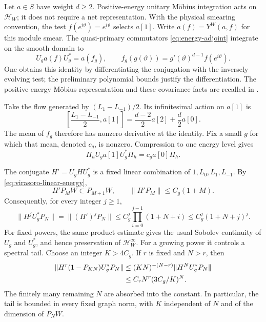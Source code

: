 Let $a\in S$ have weight $d\geq2$.  Positive-energy unitary Möbius
integration acts on $\mathcal H_W$; it does not require a net
representation.  With the physical smearing convention, the test
$f(e^{i\vartheta})=e^{i\vartheta}$ selects $a[1]$.  Write
$a(f)=Y^W(a,f)$ for this module smear.  The
quasi-primary commutators \eqref{eq:energy-adjoint} integrate on the
smooth domain to
\[
 U_g a(f)U_g^*=a(f_g),\qquad
 f_g(g(\vartheta))=g'(\vartheta)^{d-1}f(e^{i\vartheta}).
\]
One obtains this identity by differentiating the conjugation with the
inversely evolving test; the preliminary polynomial bounds justify the
differentiation.  The positive-energy Möbius representation and these
covariance facts are recalled in \cite[Section~2]{CTW}.

Take the flow generated by $(L_1-L_{-1})/2$.  Its infinitesimal action
on $a[1]$ is
\[
 \left[\frac{L_1-L_{-1}}2,a[1]\right]
       =\frac{d-2}{2}a[2]+\frac d2a[0].
\]
The mean of $f_g$ therefore has nonzero derivative at the identity.
Fix a small $g$ for which that mean, denoted $c_g$, is nonzero.
Compression to one energy level gives
\begin{equation}\label{eq:mobius-zero-compression}
 \Pi_hU_ga[1]U_g^*\Pi_h=c_g a[0]\Pi_h.
\end{equation}

The conjugate $H'=U_gHU_g^*$ is a fixed linear combination of
$1,L_0,L_1,L_{-1}$.  By \eqref{eq:virasoro-linear-energy},
\[
 H'P_MW\subset P_{M+1}W,\qquad
 \|H'P_M\|\leq C_g(1+M).
\]
Consequently, for every integer $j\geq1$,
\begin{equation}\label{eq:mobius-growing-moment}
 \|H^jU_g^*P_N\|
 =\|(H')^jP_N\|
 \leq C_g^j\prod_{i=0}^{j-1}(1+N+i)
 \leq C_g^j(1+N+j)^j.
\end{equation}
For fixed powers, the same product estimate gives the usual Sobolev
continuity of $U_g$ and $U_g^*$, and hence preservation of
$\mathcal H_W^\infty$.  For a growing power it controls a spectral
tail.  Choose an integer $K>4C_g$.  If $r$ is fixed and $N>r$, then
\begin{align}
 \|H^r(1-P_{KN})U_g^*P_N\|
 &\leq (KN)^{-(N-r)}\|H^NU_g^*P_N\|\notag\\
 &\leq C_rN^r(3C_g/K)^N.
       \label{eq:mobius-tail}
\end{align}
The finitely many remaining $N$ are absorbed into the constant.  In
particular, the tail is bounded in every fixed graph norm, with $K$
independent of $N$ and of the dimension of $P_NW$.

